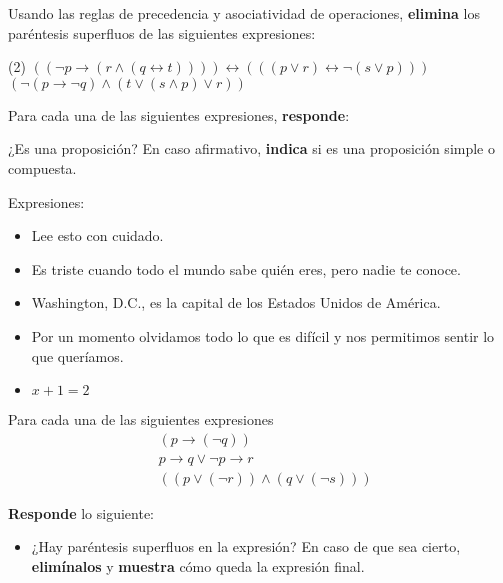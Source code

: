 \documentclass[oneside]{style}
\begin{document}
\begin{questions}[label=\protect\circled{\bfseries\arabic*}]
    \question
    {
        Usando las reglas de precedencia y asociatividad de operaciones, 
        \textbf{elimina} los paréntesis superfluos de las siguientes 
        expresiones:
        \begin{tasks}(2)
            \task $((\neg p \rightarrow (r \land (q \leftrightarrow t)))) 
            \leftrightarrow (((p \lor r) \leftrightarrow \neg (s \lor p)))$
            \task $(\neg (p \rightarrow \neg q) \land (t \lor (s \land p) \lor r))$
        \end{tasks}
    }

    \question
    {
        Para cada una de las siguientes expresiones, \textbf{responde}:
        \begin{center}
            ¿Es una proposición? En caso afirmativo, \textbf{indica} si 
            es una proposición simple o compuesta. 
        \end{center}

        Expresiones:
        \begin{itemize}
            \item Lee esto con cuidado.
            \item Es triste cuando todo el mundo sabe quién eres, pero nadie 
            te conoce. 
            \item Washington, D.C., es la capital de los Estados Unidos de 
            América. 
            \item Por un momento olvidamos todo lo que es difícil y nos 
            permitimos sentir lo que queríamos. 
            \item $x + 1 = 2$
        \end{itemize}
    }

    \question
    {
        Para cada una de las siguientes expresiones
        \begin{align*}
            &(p \rightarrow (\neg q)) \\ 
            &p \rightarrow q \lor \neg p \rightarrow r \\ 
            &((p \lor (\neg r)) \land (q \lor (\neg s)))
        \end{align*}

        \textbf{Responde} lo siguiente:
        \begin{itemize}
            \item ¿Hay paréntesis superfluos en la expresión? En caso de que 
            sea cierto, \textbf{elimínalos} y \textbf{muestra} cómo queda la 
            expresión final. 


\end{itemize}}
\end{questions}
\end{document}

